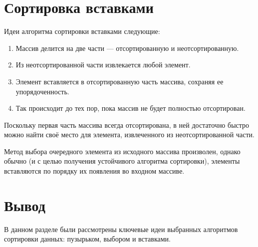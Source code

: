 \section{Сортировка вставками}

Идеи алгоритма сортировки вставками следующие\cite{selandins}:
\begin{enumerate}
	\item Массив делится на две части --- отсортированную и неотсортированную.
	\item Из неотсортированной части извлекается любой элемент.
	\item Элемент вставляется в отсортированную часть массива, сохраняя ее упорядоченность.
	\item Так происходит до тех пор, пока массив не будет полностью отсортирован.
\end{enumerate}

Поскольку первая часть массива всегда отсортирована, в ней достаточно быстро 
можно найти своё место для элемента, извлеченного из неотсортированной части.

Метод выбора очередного элемента из исходного массива произволен, однако обычно
 (и с целью получения устойчивого алгоритма сортировки), элементы вставляются по 
 порядку их появления во входном массиве.

\section{Вывод}

В данном разделе были рассмотрены ключевые идеи выбранных алгоритмов
сортировки данных: пузырьком, выбором и вставками. 